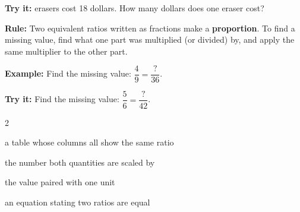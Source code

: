 \documentclass[12pt]{article}
\begin{document}
\begin{tryitbox}
\textbf{Try it:}  erasers cost 18 dollars. How many dollars does one
eraser cost?\\[2pt]
\end{tryitbox}


\begin{formulabox}
\textbf{Rule:} Two equivalent ratios written as fractions make a
\textbf{proportion}. To find a missing value, find what one part was multiplied
(or divided) by, and apply the same multiplier to the other part.
\end{formulabox}

\begin{examplebox}
\textbf{Example:} \quad Find the missing value: $\dfrac{4}{9} = \dfrac{?}{36}$.
\end{examplebox}

\begin{tryitbox}
\textbf{Try it:} \quad Find the missing value: $\dfrac{5}{6} = \dfrac{?}{42}$.\\[2pt]
\end{tryitbox}

\vspace{0.3cm}

\begin{multicols}{2}
\begin{description}[leftmargin=0.5cm, itemsep=2pt, font=\normalfont\bfseries]
  \item[Ratio table:] a table whose columns all show the same ratio
  \item[Multiplier:] the number both quantities are scaled by
  \item[Unit rate:] the value paired with one unit
  \item[Proportion:] an equation stating two ratios are equal
\end{description}
\end{multicols}
\end{document}
